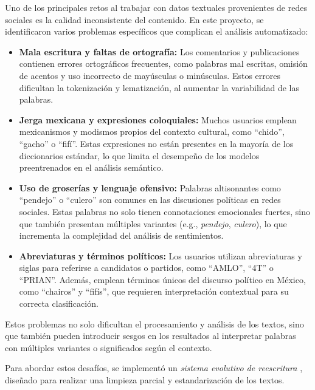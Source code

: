 \documentclass[10pt, a4paper]{article}
\begin{document}
	Uno de los principales retos al trabajar con datos textuales provenientes de redes sociales es la calidad inconsistente del contenido. En este proyecto, se identificaron varios problemas específicos que complican el análisis automatizado:
	
	\begin{itemize}
		\item \textbf{Mala escritura y faltas de ortografía:} Los comentarios y publicaciones contienen errores ortográficos frecuentes, como palabras mal escritas, omisión de acentos y uso incorrecto de mayúsculas o minúsculas. Estos errores dificultan la tokenización y lematización, al aumentar la variabilidad de las palabras.
		
		\item \textbf{Jerga mexicana y expresiones coloquiales:} Muchos usuarios emplean mexicanismos y modismos propios del contexto cultural, como “chido”, “gacho” o “fifí”. Estas expresiones no están presentes en la mayoría de los diccionarios estándar, lo que limita el desempeño de los modelos preentrenados en el análisis semántico.
		
		\item \textbf{Uso de groserías y lenguaje ofensivo:} Palabras altisonantes como “pendejo” o “culero” son comunes en las discusiones políticas en redes sociales. Estas palabras no solo tienen connotaciones emocionales fuertes, sino que también presentan múltiples variantes (e.g., \textit{pendejo}, \textit{culero}), lo que incrementa la complejidad del análisis de sentimientos.
		
		\item \textbf{Abreviaturas y términos políticos:} Los usuarios utilizan abreviaturas y siglas para referirse a candidatos o partidos, como “AMLO”, “4T” o “PRIAN”. Además, emplean términos únicos del discurso político en México, como “chairos” y “fifís”, que requieren interpretación contextual para su correcta clasificación.
		
	\end{itemize}
	
	Estos problemas no solo dificultan el procesamiento y análisis de los textos, sino que también pueden introducir sesgos en los resultados al interpretar palabras con múltiples variantes o significados según el contexto.
	
	Para abordar estos desafíos, se implementó un \textit{sistema evolutivo de reescritura} \parencite{galindo1991sistemas}, diseñado para realizar una limpieza parcial y estandarización de los textos. 
	
\end{document}
